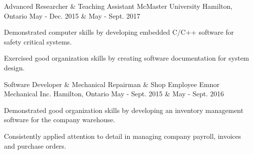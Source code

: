 \begin{cventries}
  \cventry
    {Advanced Researcher \& Teaching Assistant} %
    {McMaster University} %
    {Hamilton, Ontario} %
    {May - Dec. 2015 \& May - Sept. 2017} %
    {
      \begin{cvitems} %
        \item {Demonstrated computer skills by developing embedded C/C++ software for safety critical systems.}
        \item {Exercised good organization skills by creating software documentation for system design.}
      \end{cvitems}
    }

  \cventry
    {Software Developer \& Mechanical Repairman \& Shop Employee} %
    {Emnor Mechanical Inc.} %
    {Hamilton, Ontario} %
    {May - Sept. 2015 \& May - Sept. 2016} %
    {
      \begin{cvitems} %
        \item {Demonstrated good organization skills by developing an inventory management software for the company warehouse.}
        \item {Consistently applied attention to detail in managing company payroll, invoices and purchase orders.}
      \end{cvitems}
    }


\end{cventries}
